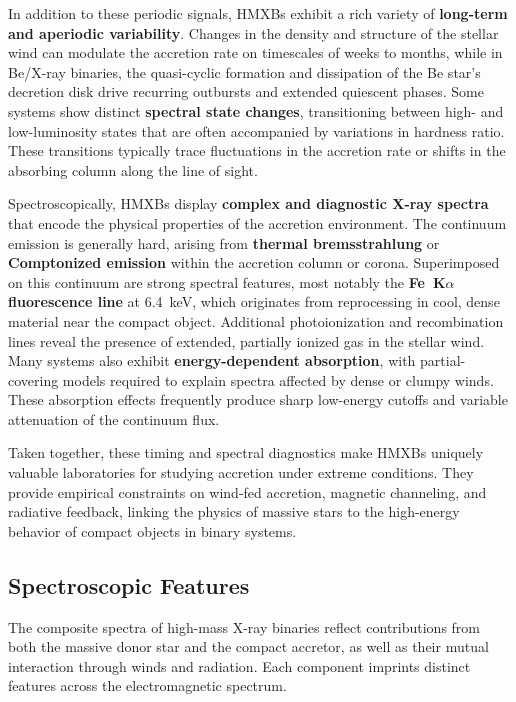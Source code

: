 \par
In addition to these periodic signals, HMXBs exhibit a rich variety of \textbf{long-term and aperiodic variability}. Changes in the density and structure of the stellar wind can modulate the accretion rate on timescales of weeks to months, while in Be/X-ray binaries, the quasi-cyclic formation and dissipation of the Be star’s decretion disk drive recurring outbursts and extended quiescent phases. Some systems show distinct \textbf{spectral state changes}, transitioning between high- and low-luminosity states that are often accompanied by variations in hardness ratio. These transitions typically trace fluctuations in the accretion rate or shifts in the absorbing column along the line of sight.

\par
Spectroscopically, HMXBs display \textbf{complex and diagnostic X-ray spectra} that encode the physical properties of the accretion environment. The continuum emission is generally hard, arising from \textbf{thermal bremsstrahlung} or \textbf{Comptonized emission} within the accretion column or corona. Superimposed on this continuum are strong spectral features, most notably the \textbf{Fe~K$\alpha$ fluorescence line} at 6.4~keV, which originates from reprocessing in cool, dense material near the compact object. Additional photoionization and recombination lines reveal the presence of extended, partially ionized gas in the stellar wind. Many systems also exhibit \textbf{energy-dependent absorption}, with partial-covering models required to explain spectra affected by dense or clumpy winds. These absorption effects frequently produce sharp low-energy cutoffs and variable attenuation of the continuum flux.

\par
Taken together, these timing and spectral diagnostics make HMXBs uniquely valuable laboratories for studying accretion under extreme conditions. They provide empirical constraints on wind-fed accretion, magnetic channeling, and radiative feedback, linking the physics of massive stars to the high-energy behavior of compact objects in binary systems.



\subsection{Spectroscopic Features}

The composite spectra of high-mass X-ray binaries reflect contributions from both the massive donor star and the compact accretor, as well as their mutual interaction through winds and radiation. Each component imprints distinct features across the electromagnetic spectrum.

